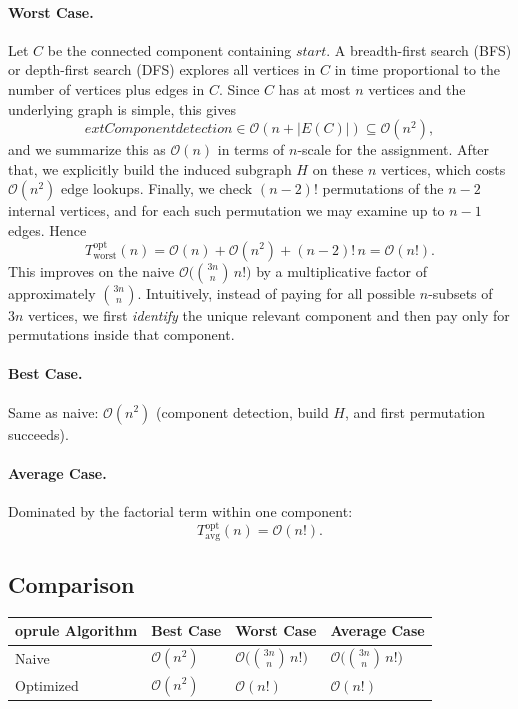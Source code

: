 \documentclass[11pt]{article}
\begin{document}
\paragraph{Worst Case.} Let $C$ be the connected component containing $\textit{start}$. A breadth-first search (BFS) or depth-first search (DFS) explores all vertices in $C$ in time proportional to the number of vertices plus edges in $C$. Since $C$ has at most $n$ vertices and the underlying graph is simple, this gives
\[
	ext{Component detection} \in \mathcal{O}(n + |E(C)|) \subseteq \mathcal{O}(n^2),
\]
and we summarize this as $\mathcal{O}(n)$ in terms of $n$-scale for the assignment. After that, we explicitly build the induced subgraph $H$ on these $n$ vertices, which costs $\mathcal{O}(n^2)$ edge lookups. Finally, we check $(n-2)!$ permutations of the $n-2$ internal vertices, and for each such permutation we may examine up to $n-1$ edges. Hence
\[
T^{\text{opt}}_{\text{worst}}(n) = \mathcal{O}(n) + \mathcal{O}(n^2) + (n-2)!\,n = \mathcal{O}(n!).
\]
This improves on the naive $\mathcal{O}\!\big(\binom{3n}{n}\, n!\big)$ by a multiplicative factor of approximately $\binom{3n}{n}$. Intuitively, instead of paying for all possible $n$-subsets of $3n$ vertices, we first \emph{identify} the unique relevant component and then pay only for permutations inside that component.

\paragraph{Best Case.} Same as naive: $\mathcal{O}(n^2)$ (component detection, build $H$, and first permutation succeeds).

\paragraph{Average Case.} Dominated by the factorial term within one component:
\[
T^{\text{opt}}_{\text{avg}}(n) = \mathcal{O}(n!).
\]

\subsection*{Comparison}
\begin{table}[h]
\centering
\begin{tabular}{@{}llll@{}}
	oprule
Algorithm & Best Case & Worst Case & Average Case \\
\midrule
Naive & $\mathcal{O}(n^2)$ & $\mathcal{O}\!\big(\binom{3n}{n}\, n!\big)$ & $\mathcal{O}\!\big(\binom{3n}{n}\, n!\big)$ \\
Optimized & $\mathcal{O}(n^2)$ & $\mathcal{O}(n!)$ & $\mathcal{O}(n!)$ \\
\bottomrule
\end{tabular}
\end{table}
\end{document}
